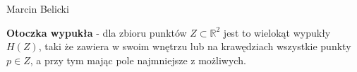 \documentclass[11pt]{article}
\newcommand*{\srcDirectory}{src}
\newcommand*{\tikzDirectory}{tikz}
\newcommand*{\tikzDirectDirectory}{\srcDirectory/\tikzDirectory}
\begin{document}
\thispagestyle{empty}
    \null
    \vspace{5cm}
    \begin{center}
        \begin{Huge}
            \fontsize{50pt}{50pt}\selectfont{Otoczki wypukłe wielokąta prostego}
        \end{Huge}
    \end{center}
    \vspace{5cm}
    
   \begin{flushright}
   
   \Huge{Marcin Belicki} 
   \end{flushright}
        
    
    \newpage
    \begin{center}
        \begin{Huge}
            \fontsize{46pt}{46pt}\selectfont{Definicja}
        \end{Huge}   
    \end{center}
    \begin{LARGE}
        \textbf{Otoczka wypukła} - dla zbioru punktów $Z\subset\mathbb{R}^2$ jest to wielokąt wypukły $H(Z)$, taki że zawiera w swoim wnętrzu lub na krawędziach wszystkie punkty $p\in Z$, a przy tym mając pole najmniejsze z możliwych.
        \begin{center}
            
        \end{center}    
    \end{LARGE}   
    
    \newpage
    

    \newpage
    

    \newpage
    

    \newpage
    

    \newpage
    
\end{document}
